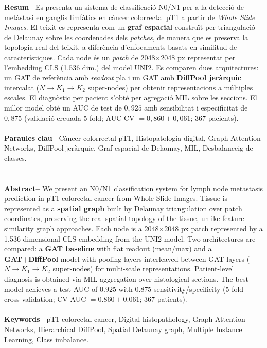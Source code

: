 \documentclass[10pt,a4paper,twocolumn,twoside]{article}
\begin{document}
\begin{@twocolumnfalse}
\begin{center}
\parbox{0.915\textwidth}
{\sffamily
\textbf{Resum--}
Es presenta un sistema de classificació N0/N1 per a la detecció de metàstasi en ganglis limfàtics
en càncer colorrectal pT1 a partir de \textit{Whole Slide Images}. El teixit es representa com un
\textbf{graf espacial} construït per triangulació de Delaunay sobre les coordenades dels \textit{patches},
de manera que es preserva la topologia real del teixit, a diferència d'enfocaments basats en similitud de
característiques. Cada node és un \textit{patch} de 2048$\times$2048 px representat per l'embedding
CLS (1.536 dim.) del model UNI2. Es comparen dues arquitectures: un GAT de referència
amb \textit{readout} pla i un GAT amb \textbf{DiffPool jeràrquic} intercalat ($N\!\to\!K_1\!\to\!K_2$
super-nodes) per obtenir representacions a múltiples escales. El diagnòstic per pacient s'obté per
agregació MIL sobre les seccions. El millor model obté un AUC de test de $0{,}925$ amb sensibilitat
i especificitat de $0{,}875$ (validació creuada 5-fold; AUC CV $= 0{,}860 \pm 0{,}061$; 367 pacients).
\\
\\
\textbf{Paraules clau-- } Càncer colorrectal pT1, Histopatologia digital, Graph Attention Networks,
DiffPool jeràrquic, Graf espacial de Delaunay, MIL, Desbalanceig de classes.\\
\\
\bigskip
\\
\textbf{Abstract--}
We present an N0/N1 classification system for lymph node metastasis prediction in pT1 colorectal
cancer from Whole Slide Images. Tissue is represented as a \textbf{spatial graph} built by Delaunay
triangulation over patch coordinates, preserving the real spatial topology of the tissue, unlike
feature-similarity graph approaches. Each node is a 2048$\times$2048 px patch represented by a
1,536-dimensional CLS embedding from the UNI2 model. Two architectures are compared: a
\textbf{GAT baseline} with flat readout (mean/max) and a \textbf{GAT+DiffPool} model
with pooling layers interleaved between GAT layers ($N\!\to\!K_1\!\to\!K_2$ super-nodes) for
multi-scale representations. Patient-level diagnosis is obtained via MIL aggregation over
histological sections. The best model achieves a test AUC of $0.925$ with $0.875$
sensitivity/specificity (5-fold cross-validation; CV AUC $= 0.860 \pm 0.061$; 367 patients).
\\
\\
\textbf{Keywords-- } pT1 colorectal cancer, Digital histopathology, Graph Attention Networks,
Hierarchical DiffPool, Spatial Delaunay graph, Multiple Instance Learning, Class imbalance.\\
}


\end{center}
\end{@twocolumnfalse}
\end{document}
